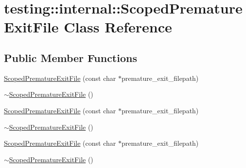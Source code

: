 \hypertarget{classtesting_1_1internal_1_1_scoped_premature_exit_file}{}\section{testing\+::internal\+::Scoped\+Premature\+Exit\+File Class Reference}
\label{classtesting_1_1internal_1_1_scoped_premature_exit_file}
\subsection*{Public Member Functions}
\begin{DoxyCompactItemize}
\item 
\mbox{\hyperlink{classtesting_1_1internal_1_1_scoped_premature_exit_file_ae520883b8a6984a864ce675acedff4a2}{Scoped\+Premature\+Exit\+File}} (const char $\ast$premature\+\_\+exit\+\_\+filepath)
\item 
\mbox{\hyperlink{classtesting_1_1internal_1_1_scoped_premature_exit_file_afa2ddc9bc1c2a90fd0dd82bb11fddc79}{$\sim$\+Scoped\+Premature\+Exit\+File}} ()
\item 
\mbox{\hyperlink{classtesting_1_1internal_1_1_scoped_premature_exit_file_ae520883b8a6984a864ce675acedff4a2}{Scoped\+Premature\+Exit\+File}} (const char $\ast$premature\+\_\+exit\+\_\+filepath)
\item 
\mbox{\hyperlink{classtesting_1_1internal_1_1_scoped_premature_exit_file_afa2ddc9bc1c2a90fd0dd82bb11fddc79}{$\sim$\+Scoped\+Premature\+Exit\+File}} ()
\item 
\mbox{\hyperlink{classtesting_1_1internal_1_1_scoped_premature_exit_file_ae520883b8a6984a864ce675acedff4a2}{Scoped\+Premature\+Exit\+File}} (const char $\ast$premature\+\_\+exit\+\_\+filepath)
\item 
\mbox{\hyperlink{classtesting_1_1internal_1_1_scoped_premature_exit_file_afa2ddc9bc1c2a90fd0dd82bb11fddc79}{$\sim$\+Scoped\+Premature\+Exit\+File}} ()
\end{DoxyCompactItemize}
